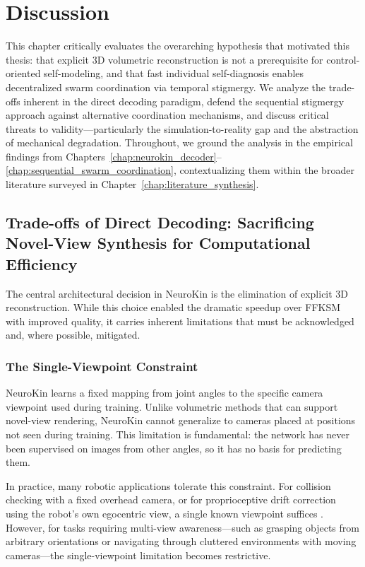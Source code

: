\documentclass[12pt,a4paper,oneside]{report}
\begin{document}
\clearpage

\chapter{Discussion}
\label{chap:discussion_main}

This chapter critically evaluates the overarching hypothesis that motivated this thesis: that explicit 3D volumetric reconstruction is not a prerequisite for control-oriented self-modeling, and that fast individual self-diagnosis enables decentralized swarm coordination via temporal stigmergy. We analyze the trade-offs inherent in the direct decoding paradigm, defend the sequential stigmergy approach against alternative coordination mechanisms, and discuss critical threats to validity---particularly the simulation-to-reality gap and the abstraction of mechanical degradation. Throughout, we ground the analysis in the empirical findings from Chapters~\ref{chap:neurokin_decoder}--\ref{chap:sequential_swarm_coordination}, contextualizing them within the broader literature surveyed in Chapter~\ref{chap:literature_synthesis}.

\section{Trade-offs of Direct Decoding: Sacrificing Novel-View Synthesis for Computational Efficiency}

The central architectural decision in NeuroKin is the elimination of explicit 3D reconstruction. While this choice enabled the dramatic speedup over FFKSM with improved quality, it carries inherent limitations that must be acknowledged and, where possible, mitigated.

\subsection{The Single-Viewpoint Constraint}

NeuroKin learns a fixed mapping from joint angles to the specific camera viewpoint used during training. Unlike volumetric methods that can support novel-view rendering, NeuroKin cannot generalize to cameras placed at positions not seen during training. This limitation is fundamental: the network has never been supervised on images from other angles, so it has no basis for predicting them.

In practice, many robotic applications tolerate this constraint. For collision checking with a fixed overhead camera, or for proprioceptive drift correction using the robot's own egocentric view, a single known viewpoint suffices \cite{hu2024teaching, chen2022full}. However, for tasks requiring multi-view awareness---such as grasping objects from arbitrary orientations or navigating through cluttered environments with moving cameras---the single-viewpoint limitation becomes restrictive.
\end{document}
